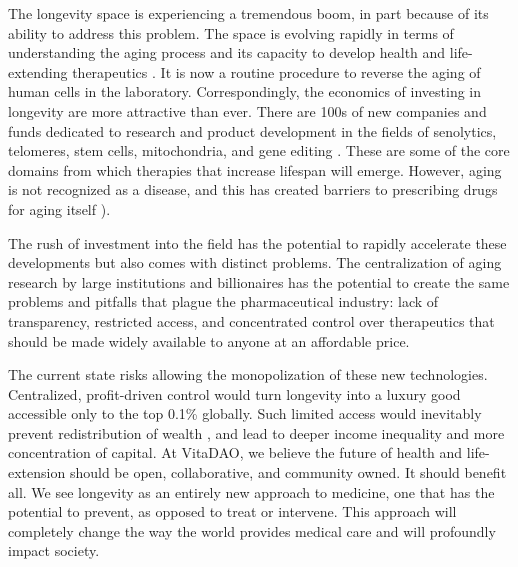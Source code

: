 \documentclass[10pt,letterpaper]{article}
\begin{document}
The longevity space is experiencing a tremendous boom, in part because of its ability to address this problem. The space is evolving rapidly in terms of understanding the aging process and its capacity to develop health and life-extending therapeutics \citep{ARDD2020}. It is now a routine procedure to reverse the aging of human cells in the laboratory. Correspondingly, the economics of investing in longevity are more attractive than ever. There are 100s of new companies and funds dedicated to research and product development in the fields of senolytics, telomeres, stem cells, mitochondria, and gene editing \citep{Pfleger2021}. These are some of the core domains from which therapies that increase lifespan will emerge. However, aging is not recognized as a disease, and this has created barriers to prescribing drugs for aging itself \citep{Suresh2014}). 

The rush of investment into the field has the potential to rapidly accelerate these developments but also comes with distinct problems. The centralization of aging research by large institutions and billionaires has the potential to create the same problems and pitfalls that plague the pharmaceutical industry: lack of transparency, restricted access, and concentrated control over therapeutics that should be made widely available to anyone at an affordable price. 

The current state risks allowing the monopolization of these new technologies. Centralized, profit-driven control would turn longevity into a luxury good accessible only to the top 0.1\% globally. Such limited access would inevitably prevent redistribution of wealth \citep{Ihle2017}, and lead to deeper income inequality and more concentration of capital. At VitaDAO, we believe the future of health and life-extension should be open, collaborative, and community owned. It should benefit all. We see longevity as an entirely new approach to medicine, one that has the potential to prevent, as opposed to treat or intervene. This approach will completely change the way the world provides medical care and will profoundly impact society. 
\end{document}
